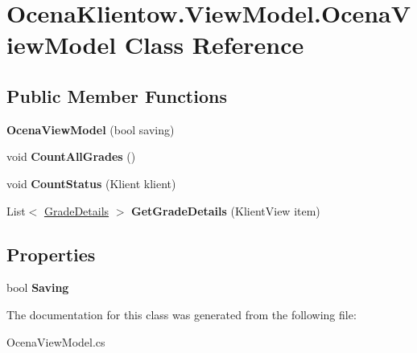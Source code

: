\hypertarget{class_ocena_klientow_1_1_view_model_1_1_ocena_view_model}{}\section{Ocena\+Klientow.\+View\+Model.\+Ocena\+View\+Model Class Reference}
\label{class_ocena_klientow_1_1_view_model_1_1_ocena_view_model}
\subsection*{Public Member Functions}
\begin{DoxyCompactItemize}
\item 
\hypertarget{class_ocena_klientow_1_1_view_model_1_1_ocena_view_model_aee665c148dedc8f23f6e57c9065e5b2e}{}\label{class_ocena_klientow_1_1_view_model_1_1_ocena_view_model_aee665c148dedc8f23f6e57c9065e5b2e} 
{\bfseries Ocena\+View\+Model} (bool saving)
\item 
\hypertarget{class_ocena_klientow_1_1_view_model_1_1_ocena_view_model_a6352178b29ca32877436fb4b9fd4d681}{}\label{class_ocena_klientow_1_1_view_model_1_1_ocena_view_model_a6352178b29ca32877436fb4b9fd4d681} 
void {\bfseries Count\+All\+Grades} ()
\item 
\hypertarget{class_ocena_klientow_1_1_view_model_1_1_ocena_view_model_a58c9ddc74465f558481f153ba9a1cbae}{}\label{class_ocena_klientow_1_1_view_model_1_1_ocena_view_model_a58c9ddc74465f558481f153ba9a1cbae} 
void {\bfseries Count\+Status} (Klient klient)
\item 
\hypertarget{class_ocena_klientow_1_1_view_model_1_1_ocena_view_model_af6de4ef3e8a859821bfb6e726bdee2b2}{}\label{class_ocena_klientow_1_1_view_model_1_1_ocena_view_model_af6de4ef3e8a859821bfb6e726bdee2b2} 
List$<$ \hyperlink{class_ocena_klientow_1_1_view_model_1_1_grade_details}{Grade\+Details} $>$ {\bfseries Get\+Grade\+Details} (Klient\+View item)
\end{DoxyCompactItemize}
\subsection*{Properties}
\begin{DoxyCompactItemize}
\item 
\hypertarget{class_ocena_klientow_1_1_view_model_1_1_ocena_view_model_a41aedbdd1a05e98bc8e921229b18f1d1}{}\label{class_ocena_klientow_1_1_view_model_1_1_ocena_view_model_a41aedbdd1a05e98bc8e921229b18f1d1} 
bool {\bfseries Saving}
\end{DoxyCompactItemize}


The documentation for this class was generated from the following file\+:\begin{DoxyCompactItemize}
\item 
Ocena\+View\+Model.\+cs\end{DoxyCompactItemize}
